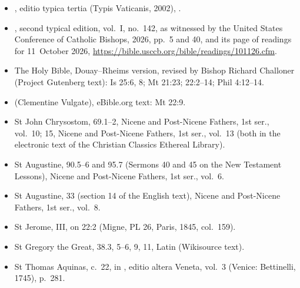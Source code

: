 {\small
\begin{itemize}\setlength{\itemsep}{0.15em}\setlength{\parskip}{0pt}
\item {}, editio typica tertia (Typis Vaticanis, 2002), .
\item {}, second typical edition, vol.~I, no.~142, as witnessed by the United States Conference of Catholic Bishops,  2026, pp.~5 and 40, and its page of readings for 11~October 2026, \url{https://bible.usccb.org/bible/readings/101126.cfm}.
\item The Holy Bible, Douay--Rheims version, revised by Bishop Richard Challoner (Project Gutenberg text): Is 25:6, 8; Mt 21:23; 22:2--14; Phil 4:12--14.
\item {} (Clementine Vulgate), eBible.org text: Mt 22:9.
\item St John Chrysostom,  69.1--2, Nicene and Post-Nicene Fathers, 1st ser., vol.~10;  15, Nicene and Post-Nicene Fathers, 1st ser., vol.~13 (both in the electronic text of the Christian Classics Ethereal Library).
\item St Augustine,  90.5--6 and 95.7 (Sermons 40 and 45 on the New Testament Lessons), Nicene and Post-Nicene Fathers, 1st ser., vol.~6.
\item St Augustine,  33 (section 14 of the English text), Nicene and Post-Nicene Fathers, 1st ser., vol.~8.
\item St Jerome,  III, on 22:2 (Migne, PL 26, Paris, 1845, col.~159).
\item St Gregory the Great,  38.3, 5--6, 9, 11, Latin (Wikisource text).
\item St Thomas Aquinas,  c.~22, in , editio altera Veneta, vol.~3 (Venice: Bettinelli, 1745), p.~281.
\end{itemize}
\par}
